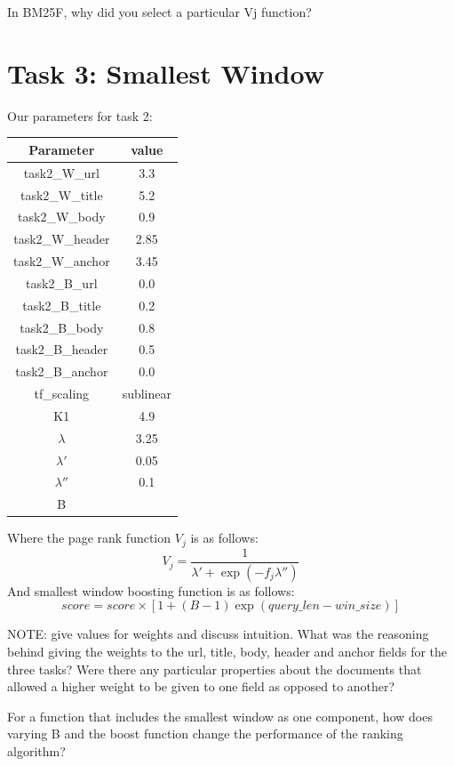 \documentclass[10pt,twocolumn]{article}
\begin{document}
In BM25F, why did you select a particular Vj function?

\section*{Task 3: Smallest Window}
Our parameters for task 2:
\begin{table}[H]
\centering
\begin{tabular}{|c|c|}
\hline
Parameter & value \\\hline
task2\_W\_url & 3.3\\\hline
task2\_W\_title & 5.2\\\hline
task2\_W\_body & 0.9\\\hline
task2\_W\_header & 2.85\\\hline
task2\_W\_anchor & 3.45\\\hline
task2\_B\_url & 0.0\\\hline
task2\_B\_title & 0.2\\\hline
task2\_B\_body & 0.8\\\hline
task2\_B\_header & 0.5\\\hline
task2\_B\_anchor & 0.0\\\hline
tf\_scaling & sublinear\\\hline
K1 & 4.9\\\hline
$\lambda$ & 3.25\\\hline
$\lambda'$ & 0.05\\\hline
$\lambda''$ & 0.1\\\hline
B & \\\hline

\end{tabular}
\end{table}
Where the page rank function $V_j$ is as follows:
\begin{equation*}
V_j = \frac{1}{\lambda'+\exp({-f_j\lambda''})}
\end{equation*}
And smallest window boosting function is as follows:
\begin{equation*}
score = score \times [1+(B-1)\exp(query\_len-win\_size)]
\end{equation*}

NOTE: give values for weights and discuss intuition.
What was the reasoning behind giving the weights to the url, title,
body, header and anchor fields for the three tasks? Were there any
particular properties about the documents that allowed a higher weight
to be given to one field as opposed to another?

For a function that includes the smallest window as one component,
how does varying B and the boost function change the performance
of the ranking algorithm?
\end{document}
